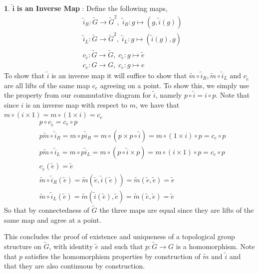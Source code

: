 \documentclass[10.5pt]{article}
\theoremstyle{definition}
\newtheorem{pb}{}
\newcommand{\tand}{\text{ and }}
\begin{document}
\begin{pb}
        \(\mathbf{\tilde{i}}\) \textbf{is an Inverse Map} : Define the following maps,
        \begin{align*}
            &\tilde{i}_R: \tilde{G} \to \tilde{G}^2, \; \tilde{i}_R: g \mapsto (g,\tilde{i}(g)) \\
            &\tilde{i}_L: \tilde{G} \to \tilde{G}^2, \; \tilde{i}_L: g \mapsto (\tilde{i}(g),g) \\
            &c_{\tilde{e}}: \tilde{G} \to \tilde{G}, \; c_{\tilde{e}}: g \mapsto \tilde{e} \\
            &c_e: G \to G, \; c_e: g \mapsto e 
        \end{align*}
        To show that \(\tilde{i}\) is an inverse map it will suffice to show that \(\tilde{m}\circ \tilde{i}_R, \tilde{m}\circ\tilde{i}_L \tand c_{\tilde{e}}\) are all lifts of the same map \(c_e\) agreeing on a point. To show this, we simply use the property from our commutative diagram for \(\tilde{i}\), namely \(p\circ\tilde{i} = i \circ p\). Note that since \(i\) is an inverse map with respect to \(m\), we have that \(m\circ(i \times 1) = m\circ(1 \times i) = c_e\)
        \begin{align*}
            &p\circ c_{\tilde{e}} = c_e \circ p \\
            &p\tilde{m}\circ \tilde{i}_R = m\circ p \tilde{i}_R = m\circ(p \times p\circ\tilde{i}) = m \circ (1 \times i) \circ p = c_e \circ p \\
            &p\tilde{m}\circ \tilde{i}_L = m\circ p \tilde{i}_L = m\circ(p\circ\tilde{i} \times p) = m \circ (i \times 1) \circ p = c_e \circ p \\
            &c_{\tilde{e}}(\tilde{e}) = \tilde{e} \\
            &\tilde{m}\circ\tilde{i}_R(\tilde{e}) = \tilde{m}(\tilde{e},\tilde{i}(\tilde{e})) = \tilde{m}(\tilde{e},\tilde{e}) = \tilde{e} \\
            &\tilde{m}\circ\tilde{i}_L(\tilde{e}) = \tilde{m}(\tilde{i}(\tilde{e}),\tilde{e}) = \tilde{m}(\tilde{e},\tilde{e}) = \tilde{e}
        \end{align*}
        So that by connectedness of \(\tilde{G}\) the three maps are equal since they are lifts of the same map and agree at a point.

        This concludes the proof of existence and uniqueness of a topological group structure on \(\tilde{G}\), with identity \(\tilde{e}\) and such that \(p: \tilde{G} \to G\) is a homomorphism. Note that \(p\) satisfies the homomorphism properties by construction of \(\tilde{m} \tand \tilde{i}\) and that they are also continuous by construction.
        
    \end{pb}
\end{document}
